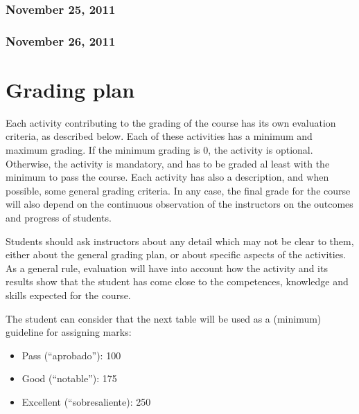 \documentclass[a4paper]{article}
\begin{document}
\subsubsection{November 25, 2011}


\subsubsection{November 26, 2011}



\section{Grading plan}

Each activity contributing to the grading of the course has its own evaluation criteria, as described below. Each of these activities has a minimum and maximum grading. If the minimum grading is 0, the activity is optional. Otherwise, the activity is mandatory, and has to be graded al least with the minimum to pass the course. Each activity has also a description, and when possible, some general grading criteria. In any case, the final grade for the course will also depend on the continuous observation of the instructors on the outcomes and progress of students.

Students should ask instructors about any detail which may not be clear to them, either about the general grading plan, or about specific aspects of the activities. As a general rule, evaluation will have into account how the activity and its results show that the student has come close to the competences, knowledge and skills expected for the course.

The student can consider that the next table will be used as a (minimum) guideline for assigning marks:

\begin{itemize}
  \item Pass (``aprobado''): 100
  \item Good (``notable''): 175
   \item Excellent (``sobresaliente): 250
\end{itemize}
\end{document}
